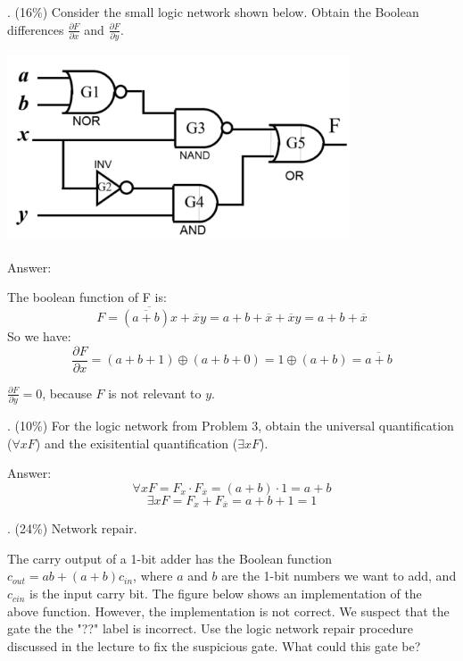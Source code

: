 \documentclass[12pt]{article}
\begin{document}
    \vspace{12pt}

    . (16\%) Consider the small logic network shown below. Obtain the Boolean differences
    $\frac{\partial F}{\partial x}$ and $\frac{\partial F}{\partial y}$.

    \begin{center}
        \includegraphics[width = 4.00in, height = 2.20in]{figure1.png}
    \end{center}

    \noindent
    Answer:

    \noindent
    The boolean function of F is:
    \[
        F = \overline{(\overline{a + b}) x} + \overline{x} y
        = a + b + \overline{x} + \overline{x} y
        = a + b + \overline{x}
    \]
    So we have:
    \[
        \frac{\partial F}{\partial x} = (a + b + 1) \oplus (a + b + 0) = 1 \oplus (a + b)
        = \overline{a + b}
    \]
    \begin{center}
        $\frac{\partial F}{\partial y} = 0$, because $F$ is not relevant to $y$.
    \end{center}

    . (10\%) For the logic network from Problem 3, obtain the universal
    quantification ($\forall{x} F$) and the exisitential quantification
    ($\exists{x} F$).

    \noindent
    Answer:
    \[ \forall{x} F = F_x \cdot F_{\overline{x}} = (a + b) \cdot 1 = a + b \]
    \[ \exists{x} F = F_x + F_{\overline{x}} = a + b + 1 = 1 \]

    . (24\%) Network repair.

    \noindent
    The carry output of a 1-bit adder has the Boolean function $c_{out} = ab + (a + b)c_{in}$,
    where $a$ and $b$ are the 1-bit numbers we want to add, and $c_{cin}$ is the input carry
    bit. The figure below shows an implementation of the above function. However, the
    implementation is not correct. We suspect that the gate the the "??" label is incorrect.
    Use the logic network repair procedure discussed in the lecture to fix the suspicious
    gate. What could this gate be?
\end{document}

